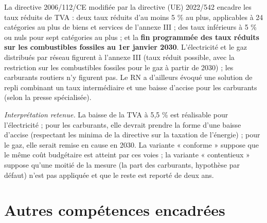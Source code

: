 \documentclass[
  11pt,
  11pt,
  a4paper,
  openany]{book}
\begin{document}
La directive 2006/112/CE modifiée par la directive (UE) 2022/542 encadre
les taux réduits de TVA : deux taux réduits d'au moins 5 \% au plus,
applicables à 24 catégories au plus de biens et services de l'annexe III
; des taux inférieurs à 5 \% ou nuls pour sept catégories au plus ; et
la \textbf{fin programmée des taux réduits sur les combustibles fossiles
au 1er janvier 2030}. L'électricité et le gaz distribués par réseau
figurent à l'annexe III (taux réduit possible, avec la restriction sur
les combustibles fossiles pour le gaz à partir de 2030) ; les carburants
routiers n'y figurent pas. Le RN a d'ailleurs évoqué une solution de
repli combinant un taux intermédiaire et une baisse d'accise pour les
carburants (selon la presse spécialisée).

\emph{Interprétation retenue.} La baisse de la TVA à 5,5 \% est
réalisable pour l'électricité ; pour les carburants, elle devrait
prendre la forme d'une baisse d'accise (respectant les minima de la
directive sur la taxation de l'énergie) ; pour le gaz, elle serait
remise en cause en 2030. La variante « conforme » suppose que le même
coût budgétaire est atteint par ces voies ; la variante « contentieux »
suppose qu'une moitié de la mesure (la part des carburants, hypothèse
par défaut) n'est pas appliquée et que le reste est reporté de deux ans.

\hypertarget{sec:autres-ue}{%
\section{Autres compétences encadrées}\label{sec:autres-ue}}
\end{document}
